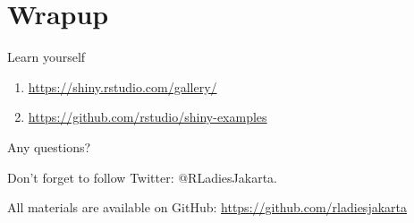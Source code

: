 \documentclass[
  ignorenonframetext,
]{beamer}
\providecommand{\tightlist}{%
  \setlength{\itemsep}{0pt}\setlength{\parskip}{0pt}}
\begin{document}
\hypertarget{wrapup}{%
\section{Wrapup}\label{wrapup}}

\begin{frame}{Learn yourself}
\protect\hypertarget{learn-yourself}{}

\begin{enumerate}[<+->]
\tightlist
\item
  \url{https://shiny.rstudio.com/gallery/}
\item
  \url{https://github.com/rstudio/shiny-examples}
\end{enumerate}

\end{frame}

\begin{frame}{Any questions?}
\protect\hypertarget{any-questions}{}

Don't forget to follow Twitter: @RLadiesJakarta.

All materials are available on GitHub:
\url{https://github.com/rladiesjakarta}

\end{frame}
\end{document}
